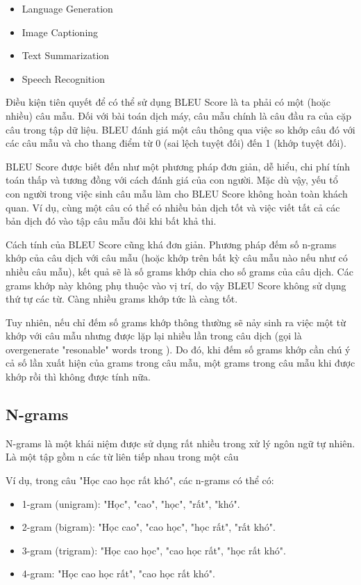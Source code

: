 \documentclass[14pt, a4paper]{article}
\numberwithin{equation}{section}
\numberwithin{algorithm}{section}
\numberwithin{figure}{section}
\numberwithin{dl}{section}
\numberwithin{md}{section}
\numberwithin{bd}{section}
\numberwithin{dn}{section}
\numberwithin{hq}{section}
\begin{document}
    \begin{itemize}
        \item Language Generation
        \item Image Captioning
        \item Text Summarization
        \item Speech Recognition
    \end{itemize}

    Điều kiện tiên quyết để có thể sử dụng BLEU Score là ta phải có một (hoặc nhiều) câu mẫu. Đối với bài toán dịch máy, câu mẫu chính là câu đầu ra của cặp câu trong tập dữ liệu. BLEU đánh giá một câu thông qua việc so khớp câu đó với các câu mẫu và cho thang điểm từ 0 (sai lệch tuyệt đối) đến 1 (khớp tuyệt đối).
    
    BLEU Score được biết đến như một phương pháp đơn giản, dễ hiểu, chi phí tính toán thấp và tương đồng với cách đánh giá của con người. Mặc dù vậy, yếu tổ con người trong việc sinh câu mẫu làm cho BLEU Score không hoàn toàn khách quan. Ví dụ, cùng một câu có thể có nhiều bản dịch tốt và việc viết tất cả các bản dịch đó vào tập câu mẫu đôi khi bất khả thi.

    Cách tính của BLEU Score cũng khá đơn giản. Phương pháp đếm số n-grams khớp của câu dịch với câu mẫu (hoặc khớp trên bất kỳ câu mẫu nào nếu như có nhiều câu mẫu), kết quả sẽ là số grams khớp chia cho số grams của câu dịch. Các grams khớp này không phụ thuộc vào vị trí, do vậy BLEU Score không sử dụng thứ tự các từ. Càng nhiều grams khớp tức là càng tốt.

    Tuy nhiên, nếu chỉ đếm số grams khớp thông thường sẽ nảy sinh ra việc một từ khớp với câu mẫu nhưng được lặp lại nhiều lần trong câu dịch (gọi là overgenerate "resonable" words trong \cite{papineni2002bleu}).
    Do đó, khi đếm số grams khớp cần chú ý cả số lần xuất hiện của grams trong câu mẫu, một grams trong câu mẫu khi được khớp rồi thì không được tính nữa.

    \subsection{N-grams}

    N-grams là một khái niệm được sử dụng rất nhiều trong xử lý ngôn ngữ tự nhiên. Là một tập gồm n các từ liên tiếp nhau trong một câu

    Ví dụ, trong câu "Học cao học rất khó", các n-grams có thể có:

    \begin{itemize}
        \item 1-gram (unigram): "Học", "cao", "học", "rất", "khó".
        \item 2-gram (bigram): "Học cao", "cao học", "học rất", "rất khó".
        \item 3-gram (trigram): "Học cao học", "cao học rất", "học rất khó".
        \item 4-gram: "Học cao học rất", "cao học rất khó".
    \end{itemize}
\end{document}
